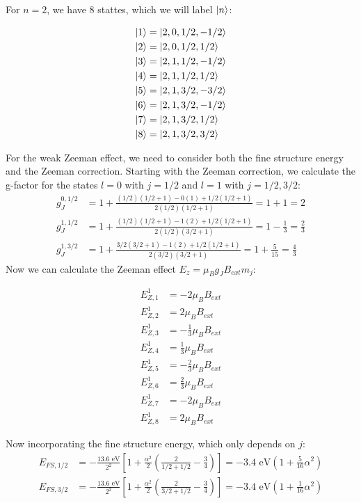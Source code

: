 \documentclass[10pt]{article}
\begin{document}
		\begin{solution}
			For $n=2$, we have 8 stattes, which we will label $\ket{n}$:

			\begin{align*}
				\ket{1} &= \textstyle\ket{2,0,1/2,-1/2}\\
				\ket{2} &= \textstyle\ket{2,0,1/2,1/2}\\
				\ket{3} &= \textstyle\ket{2,1,1/2,-1/2}\\
				\ket{4} &= \textstyle\ket{2,1,1/2,1/2}\\
				\ket{5} &= \textstyle\ket{2,1,3/2,-3/2}\\
				\ket{6} &= \textstyle\ket{2,1,3/2,-1/2}\\
				\ket{7} &= \textstyle\ket{2,1,3/2,1/2}\\
				\ket{8} &= \textstyle\ket{2,1,3/2,3/2}
			\end{align*}

			For the weak Zeeman effect, we need to consider both the fine structure energy and the Zeeman correction. Starting with the Zeeman correction, we calculate the g-factor for the states $l = 0$ with $j = 1/2$ and $l = 1$ with $j = 1/2, 3/2$: 
			\begin{align*}
				g_J^{0, 1/2} &= 1 + \frac{(1/2)(1/2 + 1) - 0(1) + 1/2(1/2 +1)}{2(1/2)(1/2 + 1)} = 1+1 = 2\\
				g_J^{1, 1/2} &= 1 + \frac{(1/2)(1/2 + 1) - 1(2) + 1/2(1/2 + 1)}{2(1/2)(3/2 + 1)} = 1 - \frac{1}{3} = \frac 23\\
				g_J^{1, 3/2} &= 1 + \frac{3/2(3/2 + 1) - 1(2) + 1/2(1/2 + 1)}{2(3/2)(3/2 + 1)} = 1 + \frac{5}{15} = \frac 43
			\end{align*}
			Now we can calculate the Zeeman effect $E_z = \mu_B g_J B_{ext}m_j$:

			\begin{align*}
				E^1_{Z, 1} &= -2\mu_B B_{ext}\\
				E^1_{Z, 2} &= 2\mu_B B_{ext}\\
				E^1_{Z, 3} &= -\frac 13\mu_B B_{ext}\\
				E^1_{Z, 4} &= \frac 13\mu_B B_{ext}\\
				E^1_{Z, 5} &= -\frac 23 \mu_B B_{ext}\\
				E^1_{Z, 6} &= \frac 23 \mu_B B_{ext}\\
				E^1_{Z, 7} &= -2\mu_B B_{ext}\\
				E^1_{Z, 8} &= 2\mu_B B_{ext}
			\end{align*}

			Now incorporating the fine structure energy, which only depends on $j$:
			\begin{align*}
				E_{FS, 1/2} &= -\frac{13.6 \text{ eV}}{2^2}\left[ 1 + \frac{\alpha^2}{2}\left( \frac{2}{1/2 + 1/2} - \frac 34\right)\right] = -3.4 \text{ eV}\left(1 + \frac{5}{16} \alpha^2\right)\\
				E_{FS, 3/2} &= -\frac{13.6 \text{ eV}}{2^2}\left[ 1 + \frac{\alpha^2}{2}\left(\frac{2}{3/2 + 1/2} - \frac 34\right) \right] = -3.4 \text{ eV}\left( 1 + \frac{1}{16}\alpha^2\right)
			\end{align*}


\end{solution}
\end{document}
